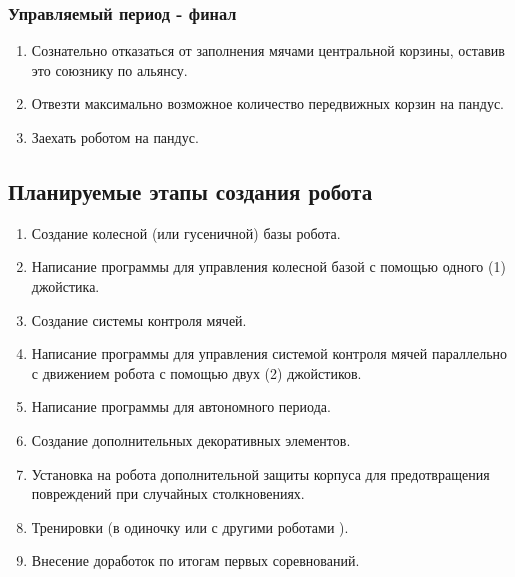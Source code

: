 \subsubsection{Управляемый период - финал}
\begin{enumerate}
	\item Сознательно отказаться от заполнения мячами центральной корзины, оставив это союзнику по альянсу.
	\item Отвезти максимально возможное количество передвижных корзин на пандус.
	\item Заехать роботом на пандус. 
\end{enumerate}
\fillpage

\subsection{Планируемые этапы создания робота}
\begin{enumerate}
	\item Создание колесной (или гусеничной) базы робота.
	\item Написание программы для управления колесной базой с помощью одного (1) джойстика.
	\item Создание системы контроля мячей.
	\item Написание программы для управления системой контроля мячей параллельно с движением робота с помощью двух (2) джойстиков.
	\item Написание программы для автономного периода.
	\item Создание дополнительных декоративных элементов.
	\item Установка на робота дополнительной защиты корпуса для предотвращения повреждений при случайных столкновениях.
	\item Тренировки (в одиночку или с другими роботами ).
	\item Внесение доработок по итогам первых соревнований.
\end{enumerate}
\fillpage
